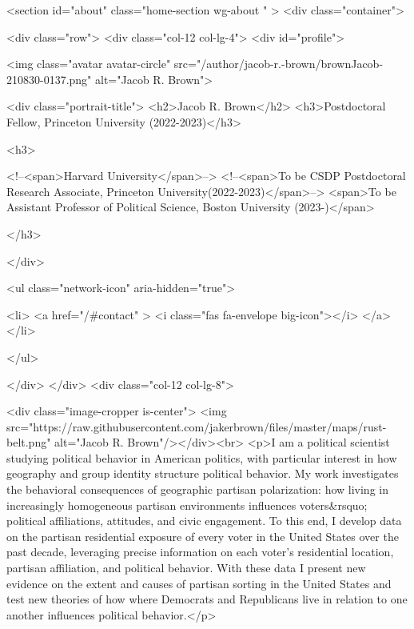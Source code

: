   <section id="about" class="home-section wg-about   "  >
    <div class="container">
















<div class="row">
  <div class="col-12 col-lg-4">
    <div id="profile">



      <img class="avatar avatar-circle" src="/author/jacob-r.-brown/brownJacob-210830-0137.png" alt="Jacob R. Brown">


      <div class="portrait-title">
        <h2>Jacob R. Brown</h2>
      <h3>Postdoctoral Fellow, Princeton University (2022-2023)</h3>


        <h3>

          <!--<span>Harvard University</span>-->
          <!--<span>To be CSDP Postdoctoral Research Associate,  Princeton University(2022-2023)</span>-->
          <span>To be Assistant Professor of Political Science, Boston University (2023-)</span>


        </h3>

      </div>

      <ul class="network-icon" aria-hidden="true">












        <li>
          <a href="/#contact" >
            <i class="fas fa-envelope big-icon"></i>
          </a>
        </li>

      </ul>

    </div>
  </div>
  <div class="col-12 col-lg-8">




    <div class="image-cropper is-center"> <img src="https://raw.githubusercontent.com/jakerbrown/files/master/maps/rust-belt.png"  alt="Jacob R. Brown"/></div><br>
<p>I am a political scientist studying political behavior in American politics, with particular interest in how geography and group identity structure political behavior. My work investigates the behavioral consequences of geographic partisan polarization: how living in increasingly homogeneous partisan environments influences voters&rsquo; political affiliations, attitudes, and civic engagement. To this end, I develop data on the partisan residential exposure of every voter in the United States over the past decade, leveraging precise information on each voter's residential location, partisan affiliation, and political behavior. With these data I present new evidence on the extent and causes of partisan sorting in the United States and test new theories of how where Democrats and Republicans live in relation to one another influences political behavior.</p>


